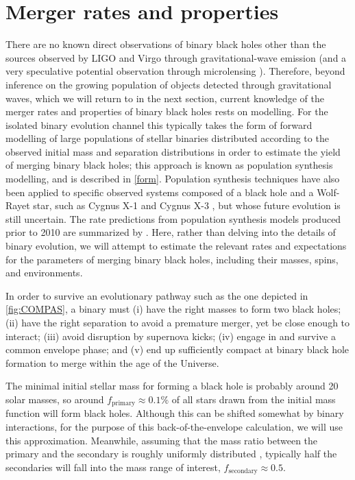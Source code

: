 \documentclass[iop,onecolumn]{revtex4}
\begin{document}
\section{Merger rates and properties}\label{merge}

There are no known direct observations of binary black holes other than the sources observed by LIGO and Virgo through gravitational-wave emission (and a very speculative potential observation through microlensing \citep{microlensing}).  Therefore, beyond inference on the growing population of objects detected through gravitational waves, which we will return to in the next section, current knowledge of the merger rates and properties of binary black holes rests on modelling.  For the isolated binary evolution channel this typically takes the form of forward modelling of large populations of stellar binaries distributed according to the observed initial mass and separation distributions in order to estimate the yield of merging binary black holes; this approach is known as population synthesis modelling, and is described in \autoref{form}.  Population synthesis techniques have also been applied to specific observed systems composed of a black hole and a Wolf-Rayet star, such as Cygnus X-1 \citep{Bulik:2008} and Cygnus X-3 \citep{CygnusX3:2012}, but whose future evolution is still uncertain.  The rate predictions from population synthesis models produced prior to 2010 are summarized by \citet{ratesdoc}.  Here, rather than delving into the details of binary evolution, we will attempt to estimate the relevant rates and expectations for the parameters of merging binary black holes, including their masses, spins, and environments.

In order to survive an evolutionary pathway such as the one depicted in \autoref{fig:COMPAS}, a binary must (i) have the right masses to form two black holes; (ii) have the right separation to avoid a premature merger, yet be close enough to interact; (iii) avoid disruption by supernova kicks; (iv) engage in and survive a common envelope phase; and (v) end up sufficiently compact at binary black hole formation to merge within the age of the Universe.  

The minimal initial stellar mass for forming a black hole is probably around 20 solar masses, so around $f_\textrm{primary} \approx 0.1\%$ of all stars drawn from the \cite{Kroupa:2002} initial mass function will form black holes. Although this can be shifted somewhat by binary interactions, for the purpose of this back-of-the-envelope calculation, we will use this approximation. Meanwhile, assuming that the mass ratio between the primary and the secondary is roughly uniformly distributed \citep{Sana:2012}, typically half the secondaries will fall into the mass range of interest, $f_\textrm{secondary} \approx 0.5$.  
\end{document}
